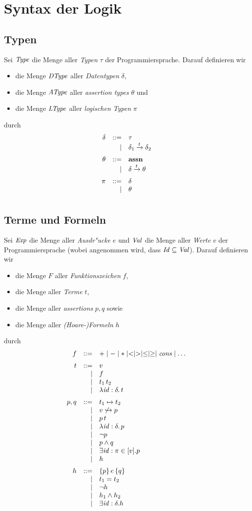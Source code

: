 \documentclass[12pt,a4paper,bigheadings]{scrartcl}
\newcommand{\assn}{\ensuremath{\mathbf{assn}}}
\newcommand{\Dtype}{\name{DType}}
\newcommand{\Atype}{\name{AType}}
\newcommand{\tto}{\ensuremath{\xrightarrow{t}}}
\renewcommand{\disjoint}[2]{\ensuremath{#2\not\hookrightarrow#1}}
\begin{document}
\section{Syntax der Logik}

\subsection{Typen}

Sei ${\text{\it Type\/}}$ die Menge aller {\em Typen} $\tau$ der Programmiersprache. Darauf definieren wir 
\begin{itemize}
  \item die Menge $\Dtype$ aller {\em Datentypen} $\delta$,
  \item die Menge $\Atype$ aller {\em assertion types} $\theta$ und
  \item die Menge ${\text{\it LType\/}}$ aller {\em logischen Typen} $\pi$
\end{itemize}
durch
\[\bgram
\delta  \is \tau
        \al \delta_1 \tto \delta_2
        \n
\theta  \is \assn
        \al \delta \tto \theta
        \n
\pi \is \delta
    \al \theta
    \n
\egram\]

\subsection{Terme und Formeln}

Sei ${\text{\it Exp\/}}$ die Menge aller {\em Ausdr"ucke} $e$ und ${\text{\it Val\/}}$ die Menge aller {\em Werte} $v$
der Programmiersprache (wobei angenommen wird, dass ${\text{\it Id\/}} \subseteq {\text{\it Val\/}}$). Darauf definieren wir 
\begin{itemize}
  \item die Menge $F$ aller {\em Funktionszeichen} $f$,
  \item die Menge  aller {\em Terme} $t$,
  \item die Menge  aller {\em assertions} $p,q$ sowie
  \item die Menge  aller {\em (Hoare-)Formeln} $h$
\end{itemize}
durch
\[\bgram
f \is + \mid - \mid * \mid < \mid > \mid \le \mid \ge \mid \Cons \mid \ldots
  \n
t \is v
  \al f
  \al \app{t_1}{t_2}
  \al \abstr{\id:\delta}{t}
  \n
p,q \is t_1 \mapsto t_2
    \al \disjoint{p}{v}
    \al \app{p}{t}
    \al \abstr{\id:\delta}{p}
    \al \neg p
    \al p \wedge q
    \al \exists \id:\pi\in[v]. p
    \al h
    \n
h \is \triple{p}{e}{q}
  \al t_1 = t_2
  \al \neg h
  \al h_1 \wedge h_2
  \al \exists \id:\delta. h
\egram\]
\end{document}
